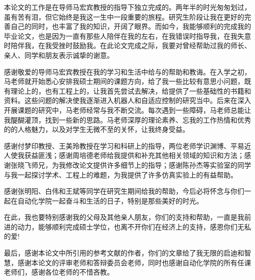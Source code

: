 
\begin{thanks}

本论文的工作是在导师马宏宾教授的指导下独立完成的。两年半的时光匆匆划过，虽有苦有泪，但它始终是我这一生中一段重要的旅程。研究生阶段让我在更好的完善自己的同时，也丰富了我的知识，开阔了眼界。而如今，我能够顺利的完成我的毕业论文，也是因为一直有那些人陪伴在我的左右，在我错误时指导我，在我失意时陪伴我，在我受挫时鼓励我。在此论文完成之际，我要对曾经帮助过我的师长、亲人、同学和朋友表示诚挚的谢意。

感谢敬爱的导师马宏宾教授在我的学习和生活中给与的帮助和教诲。在入学之初，马老师就开始悉心安排我硕士期间的课题方向，给了我一些比较有意思小问题，既有理论上的，也有工程上的，让我首先尝试去解决，给提供了一些基础性的书籍和资料。这些问题的解决使我逐渐进入机器人和自适应控制的研究当中。后来在深入开展课题的研究中，马老师经常与我不断交流。每次遇到一些障碍，马老师总能让我醍醐灌顶，找到一些新的思路。马老师深厚的理论素养、忘我的工作热情和优秀的的人格魅力，以及对学生无微不至的关怀，让我终身受益。

感谢付梦印教授、王美玲教授在学习和科研上的指导，两位老师学识渊博、平易近人使我获益匪浅；感谢周培德老师给我提供和补充其他相关领域的知识和方法；感谢张晓飞师兄，为我修改论文提供许多细节上的指导；感谢陈孙杰等实验室的同学与我一起探讨学术、工程上的难题，为我提供了许多仿真实验上的有益帮助。

感谢张明阳、白伟和王斌等同学在研究生期间给我的帮助，今后必将怀念与你们一起在自动化学院一起奋斗和生活的日子，特别是那些美好的时光。

在此，我也要特别感谢我的父母及其他亲人朋友，你们的支持和帮助，一直是我前进的动力，能够顺利完成硕士学位，也离不开你们在经济上的支持，感恩你们无私的爱!

最后，感谢本论文中所引用的参考文献的作者，你们的文章给了我无限的启迪和智慧，感谢本论文的评审老师和答辩委员会老师，同时也感谢自动化学院的所有任课老师们，感谢各位老师的不惜吝教。

\end{thanks}
